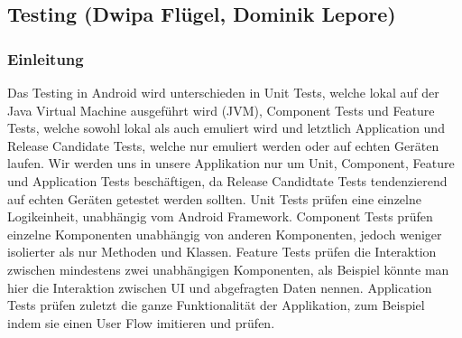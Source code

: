 \documentclass{article}
\begin{document}
\subsection{Testing \small{(Dwipa Flügel, Dominik Lepore)}}
\subsubsection{Einleitung}

Das Testing in Android wird unterschieden in Unit Tests, welche lokal auf der Java Virtual Machine ausgeführt wird (JVM), Component Tests und Feature Tests, welche sowohl lokal als auch emuliert wird und letztlich Application und Release Candidate Tests, welche nur emuliert werden oder auf echten Geräten laufen. Wir werden uns in unsere Applikation nur um Unit, Component, Feature und Application Tests beschäftigen, da Release Candidtate Tests tendenzierend auf echten Geräten getestet werden sollten. Unit Tests prüfen eine einzelne Logikeinheit, unabhängig vom Android Framework. Component Tests prüfen einzelne Komponenten unabhängig von anderen Komponenten, jedoch weniger isolierter als nur Methoden und Klassen. Feature Tests prüfen die Interaktion zwischen mindestens zwei unabhängigen Komponenten, als Beispiel könnte man hier die Interaktion zwischen UI und abgefragten Daten nennen. Application Tests prüfen zuletzt die ganze Funktionalität der Applikation, zum Beispiel indem sie einen User Flow imitieren und prüfen.
\end{document}
